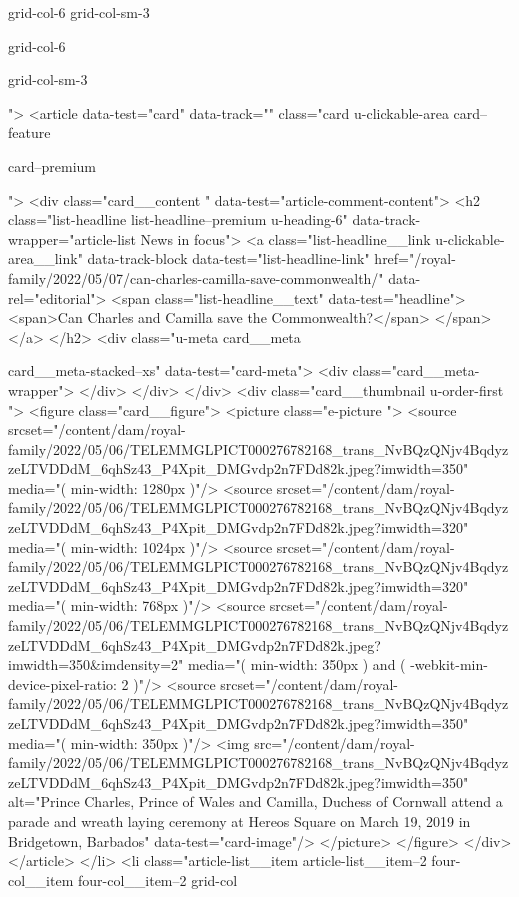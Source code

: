 {{{			
			grid-col-6 grid-col-sm-3
			
			grid-col-6
			
			
			
			
			
			grid-col-sm-3
			
			
			
			
			
			
			
			
			">
<article data-test="card" data-track="" class="card
			u-clickable-area
			card--feature
			
			card--premium
			
			
			
			
			
			 ">
<div class="card__content " data-test="article-comment-content">
<h2 class="list-headline list-headline--premium u-heading-6" data-track-wrapper="article-list News in focus">
<a class="list-headline__link u-clickable-area__link" data-track-block data-test="list-headline-link" href="/royal-family/2022/05/07/can-charles-camilla-save-commonwealth/" data-rel="editorial">
<span class="list-headline__text" data-test="headline">
<span>Can Charles and Camilla save the Commonwealth?</span>
</span>
</a>
</h2>
<div class="u-meta card__meta
						
						
						card__meta-stacked--xs" data-test="card-meta">
<div class="card__meta-wrapper">
</div>
</div>
</div>
<div class="card__thumbnail u-order-first ">
<figure class="card__figure">
<picture class="e-picture   ">
<source srcset="/content/dam/royal-family/2022/05/06/TELEMMGLPICT000276782168_trans_NvBQzQNjv4BqdyzzeLTVDDdM_6qhSz43_P4Xpit_DMGvdp2n7FDd82k.jpeg?imwidth=350" media="( min-width: 1280px )"/>
<source srcset="/content/dam/royal-family/2022/05/06/TELEMMGLPICT000276782168_trans_NvBQzQNjv4BqdyzzeLTVDDdM_6qhSz43_P4Xpit_DMGvdp2n7FDd82k.jpeg?imwidth=320" media="( min-width: 1024px )"/>
<source srcset="/content/dam/royal-family/2022/05/06/TELEMMGLPICT000276782168_trans_NvBQzQNjv4BqdyzzeLTVDDdM_6qhSz43_P4Xpit_DMGvdp2n7FDd82k.jpeg?imwidth=320" media="( min-width: 768px )"/>
<source srcset="/content/dam/royal-family/2022/05/06/TELEMMGLPICT000276782168_trans_NvBQzQNjv4BqdyzzeLTVDDdM_6qhSz43_P4Xpit_DMGvdp2n7FDd82k.jpeg?imwidth=350&imdensity=2" media="( min-width: 350px ) and ( -webkit-min-device-pixel-ratio: 2 )"/>
<source srcset="/content/dam/royal-family/2022/05/06/TELEMMGLPICT000276782168_trans_NvBQzQNjv4BqdyzzeLTVDDdM_6qhSz43_P4Xpit_DMGvdp2n7FDd82k.jpeg?imwidth=350" media="( min-width: 350px )"/>
<img src="/content/dam/royal-family/2022/05/06/TELEMMGLPICT000276782168_trans_NvBQzQNjv4BqdyzzeLTVDDdM_6qhSz43_P4Xpit_DMGvdp2n7FDd82k.jpeg?imwidth=350" alt="Prince Charles, Prince of Wales and Camilla, Duchess of Cornwall attend a parade and wreath laying ceremony at Hereos Square on March 19, 2019 in Bridgetown, Barbados" data-test="card-image"/>
</picture>
</figure>
</div>
</article>
</li>
<li class="article-list__item article-list__item--2 four-col__item four-col__item--2
			grid-col
			
}}}
